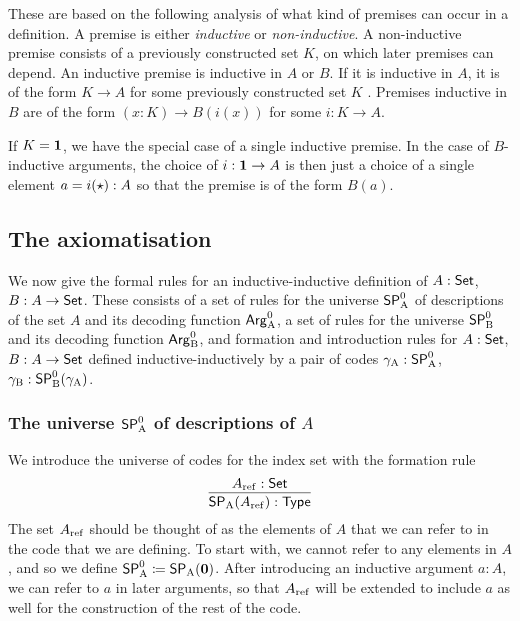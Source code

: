 \documentclass{article}
\begin{document}
These are based on the following analysis of what kind of premises can
occur in a definition. A premise is either \emph{inductive} or
\emph{non-inductive}. A non-inductive premise consists of a previously
constructed set $K$, on which later premises can depend. An inductive
premise is inductive in $A$ or $B$. If it is inductive in $A$, it is
of the form $K \to A$ for some previously constructed set $K$%
. Premises inductive in $B$ are of the form $(x : K) \to
B(i(x))$ for some $i : K \to A$. 

If $K = \mathbf{1}$, we have the special case of a single inductive
premise. In the case of $B$-inductive arguments, the choice of $i :
\mathbf{1} \to A$ is then just a choice of a single element $a = i(\star)
: A$ so that the premise is of the form $B(a)$.




\subsection{The axiomatisation}
\label{sec:formal-axiomatisation}

We now give the formal rules for an inductive-inductive definition of
$A : \mathsf{Set}$, $B : A \to \mathsf{Set}$. These consists of a set of rules for the
universe $\mathsf{SP}^{0}_{\mathrm{A}}$ of descriptions of the set $A$ and its decoding
function $\mathsf{Arg}^{0}_{\mathrm{A}}$, a set of rules for the universe $\mathsf{SP}^{0}_{\mathrm{B}}$ and its
decoding function $\mathsf{Arg}^{0}_{\mathrm{B}}$, and formation and introduction rules for
$A: \mathsf{Set}$, $B: A \to \mathsf{Set}$ defined inductive-inductively by a pair of
codes $\gamma_{\mathrm{A}} : \mathsf{SP}^{0}_{\mathrm{A}}$, $\gamma_{\mathrm{B}} : \mathsf{SP}^{0}_{\mathrm{B}}(\gamma_{\mathrm{A}})$.

\subsubsection{The universe $\mathsf{SP}^{0}_{\mathrm{A}}$ of descriptions of $A$}
\label{sec:SPA}
  
We introduce the universe of codes for the index set with the
formation rule
\[
\infer{\SPA(\Aref) : \TYPE}{\Aref : \Set}
\]
The set $A_{\mathrm{ref}}$ should be thought of as the elements of $A$ that we
can refer to in the code that we are defining. To start with, we
cannot refer to any elements in $A$, and so we define $\mathsf{SP}^{0}_{\mathrm{A}} \coloneqq
\mathsf{SP}_{\mathrm{A}}(\mathbf{0})$. After introducing an inductive argument $a : A$, we can
refer to $a$ in later arguments, so that $A_{\mathrm{ref}}$ will be extended to
include $a$ as well for the construction of the rest of the code.
\end{document}
